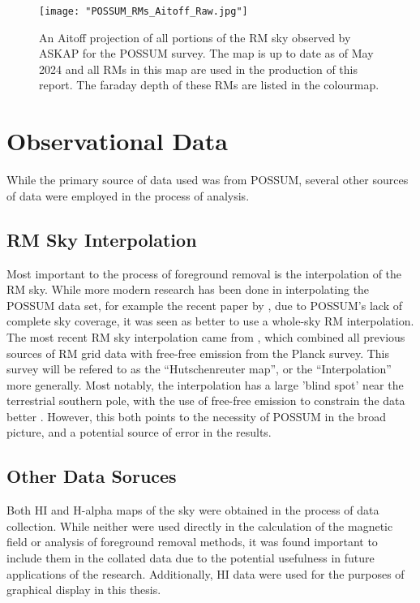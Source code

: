 \begin{figure}
    \texttt{[image: "POSSUM\_RMs\_Aitoff\_Raw.jpg"]}
    \centering
    \caption{An Aitoff projection of all portions of the RM sky observed by ASKAP for the POSSUM survey. The map is up to date as of May 2024 and all RMs in this map are used in the production of this report. The faraday depth of these RMs are listed in the colourmap.}
    \label{fig:rm_map}
\end{figure}

\section{Observational Data}
\label{sec:data}

While the primary source of data used was from POSSUM, several other sources of data were employed in the process of analysis.

\subsection{RM Sky Interpolation}
\label{ssec:legacy}

Most important to the process of foreground removal is the interpolation of the RM sky. While more modern research has been done in interpolating the POSSUM data set, for example the recent paper by \cite{ID58}, due to POSSUM's lack of complete sky coverage, it was seen as better to use a whole-sky RM interpolation. The most recent RM sky interpolation came from \cite{ID44, ID45}, which combined all previous sources of RM grid data with free-free emission from the Planck survey. This survey will be refered to as the “Hutschenreuter map”, or the “Interpolation” more generally. Most notably, the interpolation has a large 'blind spot' near the terrestrial southern pole, with the use of free-free emission to constrain the data better \citep{ID44, ID45}. However, this both points to the necessity of POSSUM in the broad picture, and a potential source of error in the results.

\subsection{Other Data Soruces}
\label{ssec:other_data}

Both HI and H-alpha maps of the sky were obtained in the process of data collection. While neither were used directly in the calculation of the magnetic field or analysis of foreground removal methods, it was found important to include them in the collated data due to the potential usefulness in future applications of the research. Additionally, HI data were used for the purposes of graphical display in this thesis.


